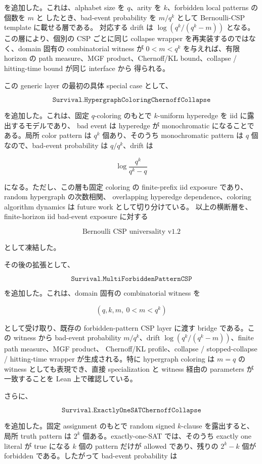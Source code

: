 \documentclass[12pt,a4paper]{article}
\begin{document}
を追加した。これは、alphabet size を \(q\)、arity を \(k\)、forbidden local patterns の個数を \(m\) と したとき、bad-event probability を \(m/q^k\) として Bernoulli-CSP template に載せる層である。 対応する drift は \(\log(q^k/(q^k-m))\) となる。この層により、個別の CSP ごとに同じ collapse wrapper を再実装するのではなく、domain 固有の combinatorial witness が \(0<m<q^k\) を与えれば、有限 horizon の path measure、MGF product、Chernoff/KL bound、collapse / hitting-time bound が同じ interface から 得られる。

この generic layer の最初の具体 special case として、

\[
\texttt{Survival.HypergraphColoringChernoffCollapse}
\]

を追加した。これは、固定 \(q\)-coloring のもとで \(k\)-uniform hyperedge を iid に露出するモデルであり、 bad event は hyperedge が monochromatic になることである。局所 color pattern は \(q^k\) 個あり、そのうち monochromatic pattern は \(q\) 個なので、bad-event probability は \(q/q^k\)、drift は

\[
\log\frac{q^k}{q^k-q}
\]

になる。ただし、この層も固定 coloring の finite-prefix iid exposure であり、random hypergraph の次数相関、 overlapping hyperedge dependence、coloring algorithm dynamics は future work として切り分けている。 以上の横断層を、finite-horizon iid bad-event exposure に対する

\[
\text{Bernoulli CSP universality v1.2}
\]

として凍結した。

その後の拡張として、

\[
\texttt{Survival.MultiForbiddenPatternCSP}
\]

を追加した。これは、domain 固有の combinatorial witness を

\[
(q,k,m,\ 0<m<q^k)
\]

として受け取り、既存の forbidden-pattern CSP layer に渡す bridge である。この witness から bad-event probability \(m/q^k\)、drift \(\log(q^k/(q^k-m))\)、finite path measure、MGF product、 Chernoff/KL profile、collapse / stopped-collapse / hitting-time wrapper が生成される。特に hypergraph coloring は \(m=q\) の witness としても表現でき、直接 specialization と witness 経由の parameters が一致することを Lean 上で確認している。

さらに、

\[
\texttt{Survival.ExactlyOneSATChernoffCollapse}
\]

を追加した。固定 assignment のもとで random signed \(k\)-clause を露出すると、局所 truth pattern は \(2^k\) 個ある。exactly-one-SAT では、そのうち exactly one literal が true になる \(k\) 個の pattern だけが allowed であり、残りの \(2^k-k\) 個が forbidden である。したがって bad-event probability は
\end{document}

